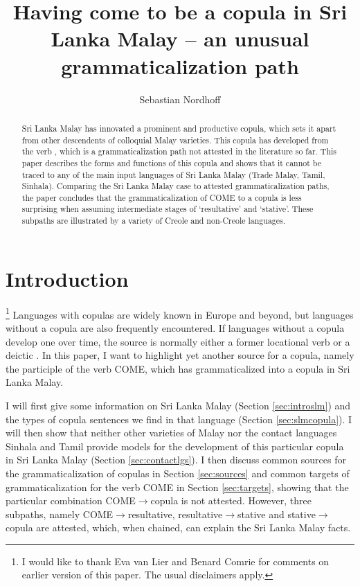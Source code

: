 \documentclass[a4paper,12pt]{article}
\title{Having come to be a copula in Sri Lanka Malay -- an unusual grammaticalization path}
\author{Sebastian Nordhoff}
\begin{document}
\maketitle

\begin{abstract}
Sri Lanka Malay has innovated a prominent and productive copula, which sets it apart from other descendents of colloquial Malay varieties. This copula has developed from the verb , which is a grammaticalization path not attested in the literature so far. This paper describes the forms and functions of this copula and shows that it cannot be traced to any of the main input languages of Sri Lanka Malay (Trade Malay, Tamil, Sinhala). Comparing the Sri Lanka Malay case to attested grammaticalization paths, the paper concludes that the grammaticalization of COME to a copula is less surprising when assuming intermediate stages of `resultative' and `stative'. These subpaths are illustrated by a variety of Creole and non-Creole languages.
\end{abstract}

\section{Introduction}
\thanks{I would like to thank Eva van Lier and Benard Comrie for comments on earlier version of this paper. The usual disclaimers apply.}
Languages with copulas are widely known in Europe and beyond, but languages without a copula are also frequently encountered. If languages without a copula develop one over time, the source is normally either a former locational verb or a deictic \citep[91]{Stassen1997}. In this paper, I want to highlight yet another source for a copula, namely the participle of the verb COME, which has grammaticalized into a copula in Sri Lanka Malay.

I will first give some information on Sri Lanka Malay (Section \ref{sec:introslm})
and the types of copula sentences we find in that language (Section \ref{sec:slmcopula}).
I will then show that neither other varieties of Malay nor the contact languages Sinhala and Tamil provide models for the development of this particular copula in Sri Lanka Malay (Section \ref{sec:contactlgs}). I then discuss common sources for the grammaticalization of copulas in Section \ref{sec:sources} and common targets of grammaticalization for the verb COME in Section \ref{sec:targets}, showing that the particular combination COME$\to$copula is not attested. However, three subpaths, namely  COME$\to$resultative, resultative$\to$stative and stative$\to$copula are attested, which, when chained, can explain the Sri Lanka Malay facts.
\end{document}
